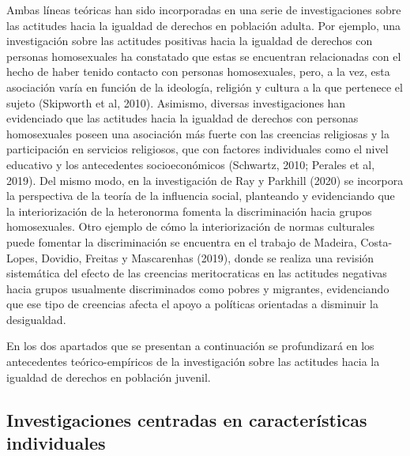 \documentclass[12pt,twoside]{templates/facsothesis}
\begin{document}
Ambas líneas teóricas han sido incorporadas en una serie de investigaciones sobre las actitudes hacia la igualdad de derechos en población adulta. Por ejemplo, una investigación sobre las actitudes positivas hacia la igualdad de derechos con personas homosexuales ha constatado que estas se encuentran relacionadas con el hecho de haber tenido contacto con personas homosexuales, pero, a la vez, esta asociación varía en función de la ideología, religión y cultura a la que pertenece el sujeto (Skipworth et al, 2010). Asimismo, diversas investigaciones han evidenciado que las actitudes hacia la igualdad de derechos con personas homosexuales poseen una asociación más fuerte con las creencias religiosas y la participación en servicios religiosos, que con factores individuales como el nivel educativo y los antecedentes socioeconómicos (Schwartz, 2010; Perales et al, 2019). Del mismo modo, en la investigación de Ray y Parkhill (2020) se incorpora la perspectiva de la teoría de la influencia social, planteando y evidenciando que la interiorización de la heteronorma fomenta la discriminación hacia grupos homosexuales. Otro ejemplo de cómo la interiorización de normas culturales puede fomentar la discriminación se encuentra en el trabajo de Madeira, Costa-Lopes, Dovidio, Freitas y Mascarenhas (2019), donde se realiza una revisión sistemática del efecto de las creencias meritocraticas en las actitudes negativas hacia grupos usualmente discriminados como pobres y migrantes, evidenciando que ese tipo de creencias afecta el apoyo a políticas orientadas a disminuir la desigualdad.

En los dos apartados que se presentan a continuación se profundizará en los antecedentes teórico-empíricos de la investigación sobre las actitudes hacia la igualdad de derechos en población juvenil.

\hypertarget{investigaciones-centradas-en-caracteruxedsticas-individuales}{%
\subsection{Investigaciones centradas en características individuales}\label{investigaciones-centradas-en-caracteruxedsticas-individuales}}
\end{document}
